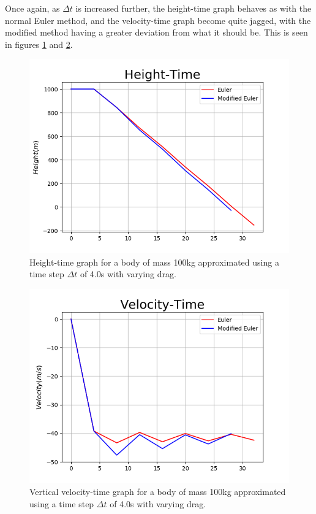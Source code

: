 \documentclass[twocolumn,prl,nobalancelastpage,aps,10pt]{revtex4-1}
\begin{document}
Once again, as $\Delta t$ is increased further, the height-time graph behaves as with the normal Euler method, and the velocity-time graph become quite jagged, with the modified method having a greater deviation from what it should be. This is seen in figures \ref{euler-fig-ht-t=4.0} and \ref{euler-fig-vt-t=4.0}.
\begin{figure}
	\includegraphics*[width=0.96\linewidth,clip]{euler-fig-ht-t=40}
	\caption{Height-time graph for a body of mass 100kg approximated using a time step $\Delta t$ of  4.0s with varying drag.}\label{euler-fig-ht-t=4.0}
\end{figure}
\begin{figure}
	\includegraphics*[width=0.96\linewidth,clip]{euler-fig-vt-t=40}
	\caption{Vertical velocity-time graph for a body of mass 100kg approximated using a time step $\Delta t$ of  4.0s with varying drag.}\label{euler-fig-vt-t=4.0}
\end{figure}
\end{document}
